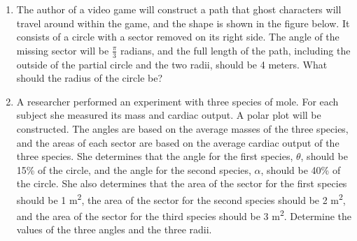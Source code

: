 \begin{enumerate}
\item The author of a video game will construct a path that
  ghost characters will travel around within the game, and the shape
  is shown in the figure below. It consists of a circle with a sector
  removed on its right side. The angle of the missing sector will be
  $\frac{\pi}{3}$ radians, and the full length of the path, including
  the outside of the partial circle and the two radii, should be 4
  meters. What should the radius of the circle be? \\ \samepage      

\item A researcher performed an experiment with three
  species of mole. For each subject she measured its mass and cardiac
  output. A polar plot will be constructed. The angles are based on
  the average masses of the three species, and the areas of each
  sector are based on the average cardiac output of the three
  species. She determines that the angle for the first species,
  $\theta$, should be 15\% of the circle, and the angle for the second
  species, $\alpha$, should be 40\% of the circle. She also determines
  that the area of the sector for the first species should be 1
  m\textsuperscript{2}, the area of the sector for the second species
  should be 2 m\textsuperscript{2}, and the area of the sector for the
  third species should be 3 m\textsuperscript{2}. Determine the
  values of the three angles and the three radii.

\end{enumerate}

